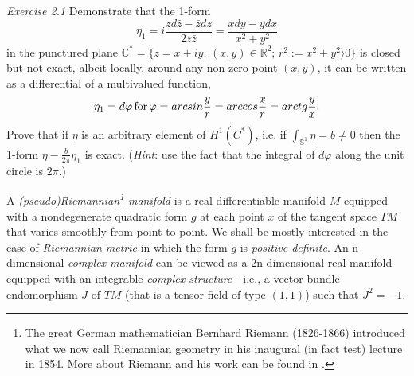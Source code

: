 \documentclass[12pt]{article}
\begin{document}
{\it Exercise 2.1} Demonstrate that the 1-form
\begin{equation}
\label{H1}
\eta_1 = i\frac{zd{\bar z} - {\bar z}dz}{2z{\bar z}} = \frac{xdy - ydx}{x^2 + 
y^2}
\end{equation}
in the punctured plane ${\mathbb C}^* = \{z=x+iy, \, (x,y)\in{\mathbb R}^2; \,
r^2:= x^2 + y^2 \rangle 0\}$ is closed but not exact, albeit locally, around any non-zero
point $(x, y)$, it can be written as a differential of a multivalued function,
\begin{equation}
\label{dphi}
\eta_1 = d\varphi \, {\rm for} \, \varphi = arcsin\frac{y}{r}
= arccos\frac{x}{r} = arctg\frac{y}{x}.
\end{equation}
Prove that if $\eta$ is an arbitrary element of $H^1(C^*)$, i.e. if $\int_{{\mathbb S}^1}
\eta = b\neq 0$ then the 1-form $\eta - \frac{b}{2\pi} \eta_1$ is exact.
({\it Hint}: use the fact that the integral of $d\varphi$ along the unit circle is $2\pi$.)

A {\it (pseudo)Riemannian\footnote{The great German mathematician Bernhard Riemann (1826-1866) 
introduced what we now call Riemannian geometry in his inaugural (in fact test) lecture 
in 1854. More about Riemann and his work can be found in \cite{Mo}.} manifold} is a real
differentiable manifold $M$ equipped with a nondegenerate quadratic form $g$ at each point 
$x$ of the tangent space $TM$ that varies smoothly from point to point. We shall be mostly 
interested in the case of {\it Riemannian metric} in which the form $g$ is {\it positive 
definite}. An n-dimensional {\it complex manifold} can be viewed as a 2n dimensional real
manifold equipped with an integrable {\it complex structure} - i.e., a vector bundle  
endomorphism $J$ of $TM$ (that is a tensor field of type $(1, 1)$) such that $J^2 = -1$.
\end{document}

